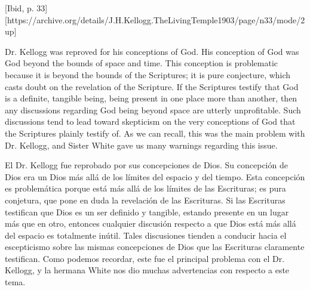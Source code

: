 [Ibid, p. 33][https://archive.org/details/J.H.Kellogg.TheLivingTemple1903/page/n33/mode/2up]


Dr. Kellogg was reproved for his conceptions of God. His conception of God was God beyond the bounds of space and time. This conception is problematic because it is beyond the bounds of the Scriptures; it is pure conjecture, which casts doubt on the revelation of the Scripture. If the Scriptures testify that God is a definite, tangible being, being present in one place more than another, then any discussions regarding God being beyond space are utterly unprofitable. Such discussions tend to lead toward skepticism on the very conceptions of God that the Scriptures plainly testify of. As we can recall, this was the main problem with Dr. Kellogg, and Sister White gave us many warnings regarding this issue.


El Dr. Kellogg fue reprobado por sus concepciones de Dios. Su concepción de Dios era un Dios más allá de los límites del espacio y del tiempo. Esta concepción es problemática porque está más allá de los límites de las Escrituras; es pura conjetura, que pone en duda la revelación de las Escrituras. Si las Escrituras testifican que Dios es un ser definido y tangible, estando presente en un lugar más que en otro, entonces cualquier discusión respecto a que Dios está más allá del espacio es totalmente inútil. Tales discusiones tienden a conducir hacia el escepticismo sobre las mismas concepciones de Dios que las Escrituras claramente testifican. Como podemos recordar, este fue el principal problema con el Dr. Kellogg, y la hermana White nos dio muchas advertencias con respecto a este tema.


